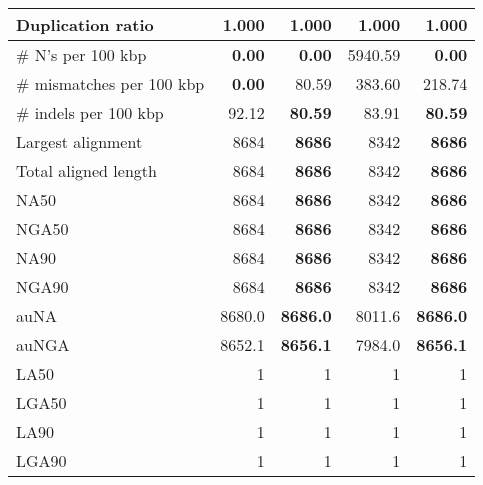 \documentclass[12pt,a4paper]{article}
\begin{document}
\begin{table}[ht]
\begin{center}
\begin{tabular}{|l*{4}{|r}|}
Duplication ratio & 1.000 & 1.000 & 1.000 & 1.000 \\ \hline
\# N's per 100 kbp & {\bf 0.00} & {\bf 0.00} & 5940.59 & {\bf 0.00} \\ \hline
\# mismatches per 100 kbp & {\bf 0.00} & 80.59 & 383.60 & 218.74 \\ \hline
\# indels per 100 kbp & 92.12 & {\bf 80.59} & 83.91 & {\bf 80.59} \\ \hline
Largest alignment & 8684 & {\bf 8686} & 8342 & {\bf 8686} \\ \hline
Total aligned length & 8684 & {\bf 8686} & 8342 & {\bf 8686} \\ \hline
NA50 & 8684 & {\bf 8686} & 8342 & {\bf 8686} \\ \hline
NGA50 & 8684 & {\bf 8686} & 8342 & {\bf 8686} \\ \hline
NA90 & 8684 & {\bf 8686} & 8342 & {\bf 8686} \\ \hline
NGA90 & 8684 & {\bf 8686} & 8342 & {\bf 8686} \\ \hline
auNA & 8680.0 & {\bf 8686.0} & 8011.6 & {\bf 8686.0} \\ \hline
auNGA & 8652.1 & {\bf 8656.1} & 7984.0 & {\bf 8656.1} \\ \hline
LA50 & 1 & 1 & 1 & 1 \\ \hline
LGA50 & 1 & 1 & 1 & 1 \\ \hline
LA90 & 1 & 1 & 1 & 1 \\ \hline
LGA90 & 1 & 1 & 1 & 1 \\ \hline
\end{tabular}
\end{center}
\end{table}
\end{document}
